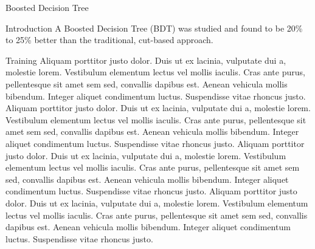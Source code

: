 \begin{section}{Boosted Decision Tree}
\begin{subsection}{Introduction}
A Boosted Decision Tree (BDT) was studied and found to be 20\% to 25\% better than the traditional, cut-based approach. 
\end{subsection}
\begin{subsection}{Training}
Aliquam porttitor justo dolor. Duis ut ex lacinia, vulputate dui a, molestie lorem. Vestibulum elementum lectus vel mollis iaculis. Cras ante purus, pellentesque sit amet sem sed, convallis dapibus est. Aenean vehicula mollis bibendum. Integer aliquet condimentum luctus. Suspendisse vitae rhoncus justo. Aliquam porttitor justo dolor. Duis ut ex lacinia, vulputate dui a, molestie lorem. Vestibulum elementum lectus vel mollis iaculis. Cras ante purus, pellentesque sit amet sem sed, convallis dapibus est. Aenean vehicula mollis bibendum. Integer aliquet condimentum luctus. Suspendisse vitae rhoncus justo. Aliquam porttitor justo dolor. Duis ut ex lacinia, vulputate dui a, molestie lorem. Vestibulum elementum lectus vel mollis iaculis. Cras ante purus, pellentesque sit amet sem sed, convallis dapibus est. Aenean vehicula mollis bibendum. Integer aliquet condimentum luctus. Suspendisse vitae rhoncus justo. Aliquam porttitor justo dolor. Duis ut ex lacinia, vulputate dui a, molestie lorem. Vestibulum elementum lectus vel mollis iaculis. Cras ante purus, pellentesque sit amet sem sed, convallis dapibus est. Aenean vehicula mollis bibendum. Integer aliquet condimentum luctus. Suspendisse vitae rhoncus justo.


\end{subsection}
\end{section}
